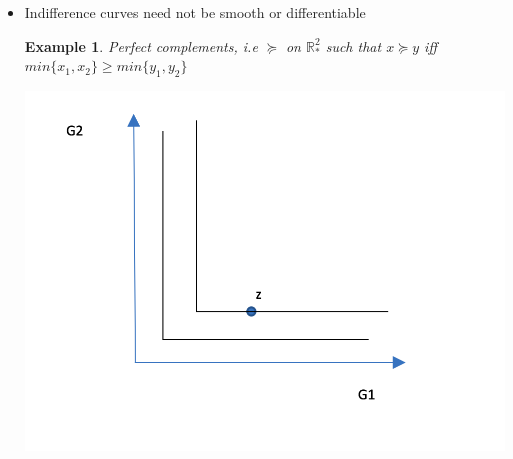 \documentclass[twoside]{article}
\newtheorem{ex}[theorem]{Example}
\begin{document}
\begin{itemize}
\begin{ex}
\begin{center}
\end{center} \end{ex}
\item Indifference curves need not be smooth or differentiable 
\begin{ex}
Perfect complements, i.e \(\succeq\) on \(\mathbb{R}_*^2\) such that \(x \succeq y \) iff \(min \{ x_1, x_2\} \geq min \{y_1, y_2\}\)
\begin{center}
\includegraphics[scale=0.4]{6}
\end{center}
\end{ex}
\end{itemize}
\end{document}

